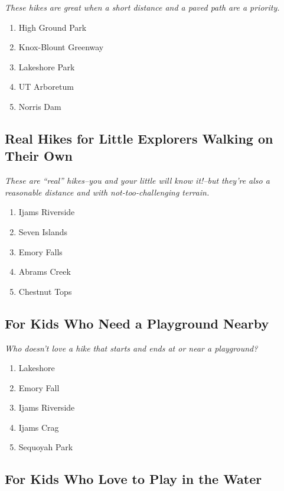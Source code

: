 \documentclass[
  letterpaper,
  DIV=11,
  numbers=noendperiod]{scrreprt}
\providecommand{\tightlist}{%
  \setlength{\itemsep}{0pt}\setlength{\parskip}{0pt}}\usepackage{longtable,booktabs,array}
\begin{document}
\emph{These hikes are great when a short distance and a paved path are a
priority.}

\begin{enumerate}
\def\labelenumi{\arabic{enumi}.}
\tightlist
\item
  High Ground Park
\item
  Knox-Blount Greenway
\item
  Lakeshore Park
\item
  UT Arboretum
\item
  Norris Dam
\end{enumerate}

\subsection{Real Hikes for Little Explorers Walking on Their
Own}\label{real-hikes-for-little-explorers-walking-on-their-own}

\emph{These are ``real'' hikes--you and your little will know it!--but
they're also a reasonable distance and with not-too-challenging
terrain.}

\begin{enumerate}
\def\labelenumi{\arabic{enumi}.}
\tightlist
\item
  Ijams Riverside
\item
  Seven Islands
\item
  Emory Falls
\item
  Abrams Creek
\item
  Chestnut Tops
\end{enumerate}

\subsection{For Kids Who Need a Playground
Nearby}\label{for-kids-who-need-a-playground-nearby}

\emph{Who doesn't love a hike that starts and ends at or near a
playground?}

\begin{enumerate}
\def\labelenumi{\arabic{enumi}.}
\tightlist
\item
  Lakeshore
\item
  Emory Fall
\item
  Ijams Riverside
\item
  Ijams Crag
\item
  Sequoyah Park
\end{enumerate}

\subsection{For Kids Who Love to Play in the
Water}\label{for-kids-who-love-to-play-in-the-water}
\end{document}

